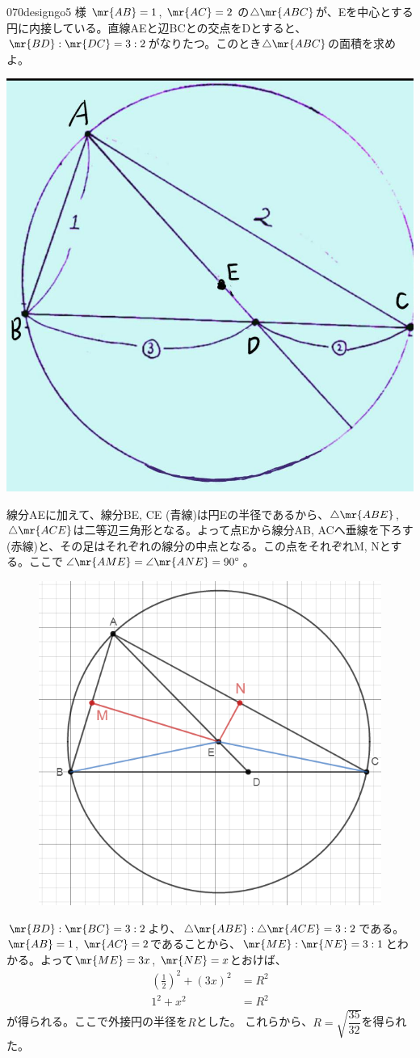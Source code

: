 \begin{thm}{070}{}{designgo5 様}
 $\mr{AB}=1$, $\mr{AC}=2$ の$\triangle\mr{ABC}$が、Eを中心とする円に内接している。直線AEと辺BCとの交点をDとすると、$\mr{BD}:\mr{DC}=3:2$がなりたつ。このとき$\triangle\mr{ABC}$の面積を求めよ。
 \begin{center}
  \includegraphics[bb=0 0 922 934,width=0.7\linewidth]{../problems/Q_070/Q_070.jpg}
 \end{center}
\end{thm}

線分AEに加えて、線分BE, CE (青線)は円Eの半径であるから、$\triangle\mr{ABE}$, $\triangle\mr{ACE}$は二等辺三角形となる。よって点Eから線分AB, ACへ垂線を下ろす(赤線)と、その足はそれぞれの線分の中点となる。この点をそれぞれM, Nとする。ここで$\angle\mr{AME}=\angle\mr{ANE}=90^\circ$。
\begin{figure}[H]
 \centering
 \includegraphics[width=0.7\linewidth]{../problems/Q_070/A_070-1.png}
\end{figure}
$\mr{BD}:\mr{BC}=3:2$より、$\triangle\mr{ABE}:\triangle\mr{ACE}=3:2$である。$\mr{AB}=1$, $\mr{AC}=2$であることから、$\mr{ME}:\mr{NE}=3:1$とわかる。よって$\mr{ME}=3x$, $\mr{NE}=x$とおけば、
\begin{align*}
 \left(\frac{1}{2}\right)^2+(3x)^2&=R^2 \\
 1^2+x^2&=R^2
\end{align*}
が得られる。ここで外接円の半径を$R$とした。 これらから、$R=\sqrt{\dfrac{35}{32}}$を得られた。

